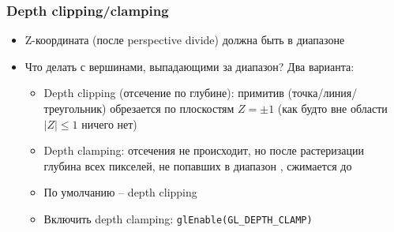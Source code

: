 \documentclass{beamer}
\begin{document}
\begin{frame}[fragile]
\frametitle{Depth clipping/clamping}
\begin{itemize}
\item Z-координата (после perspective divide) должна быть в диапазоне \begin{math}[-1, 1]\end{math}
\pause
\item Что делать с вершинами, выпадающими за диапазон? Два варианта:
\pause
\begin{itemize}
\item Depth clipping (отсечение по глубине): примитив (точка/линия/треугольник) обрезается по плоскостям \begin{math}Z = \pm 1\end{math} (как будто вне области \begin{math}|Z|\leq 1\end{math} ничего нет)
\pause
\item Depth clamping: отсечения не происходит, но после растеризации глубина всех пикселей, не попавших в диапазон \begin{math}[-1, 1]\end{math}, сжимается до \begin{math}[-1, 1]\end{math}
\pause
\item По умолчанию -- depth clipping
\item Включить depth clamping: \verb|glEnable(GL_DEPTH_CLAMP)|
\end{itemize}
\end{itemize}
\end{frame}
\end{document}
